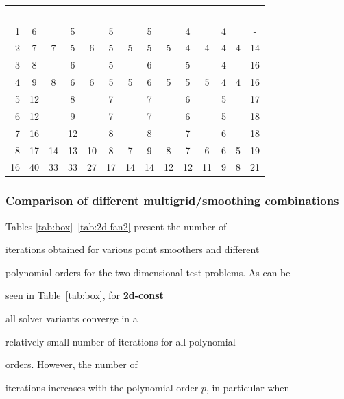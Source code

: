 \documentclass[smallcondensed,final]{svjour3}     %
\begin{document}
\begin{table}
\begin{tabular}{|r|c c|c c|c c||c c|c c|c c||c|}
~ \\

 \cline{2-13}

1 & 6 & & 5 & & 5 & & 5 & & 4 & & 4 & & -   \\

2 & 7 & 7 & 5 & 6 & 5 & 5 & 5 & 5 & 4 & 4 & 4 & 4 & 14  \\

3 & 8 & & 6 & & 5 & & 6 & & 5 & & 4 & & 16   \\

4 & 9 & 8 & 6 & 6 & 5 & 5 & 6 & 5 & 5 & 5 & 4 & 4 & 16  \\

5 & 12 & & 8 & & 7 & & 7 & & 6 & & 5 & & 17 \\

6 & 12 & & 9 & & 7 & & 7 & & 6 & & 5 & & 18 \\

7 & 16 & & 12 & & 8 & & 8 & & 7 & & 6 & & 18  \\

8 & 17 & 14 & 13 & 10 & 8 & 7 & 9 & 8 & 7 & 6 & 6 & 5 & 19 \\

16 & 40 & 33 & 33 & 27 & 17 & 14 & 14 & 12 & 12 & 11 & 9 & 8 & 21 \\

\hline

  \end{tabular}

\end{table}



\subsubsection{Comparison of different multigrid/smoothing combinations}\label{subsec:num_point}

Tables \ref{tab:box}--\ref{tab:2d-fan2} present the number of

iterations obtained for various point smoothers and different

polynomial orders for the two-dimensional test problems. As can be

seen in Table~\ref{tab:box}, for {\bf 2d-const}

all solver variants converge in a

relatively small number of iterations for all polynomial

orders. However, the number of

iterations increases with the polynomial order $p$, in particular when
\end{document}
